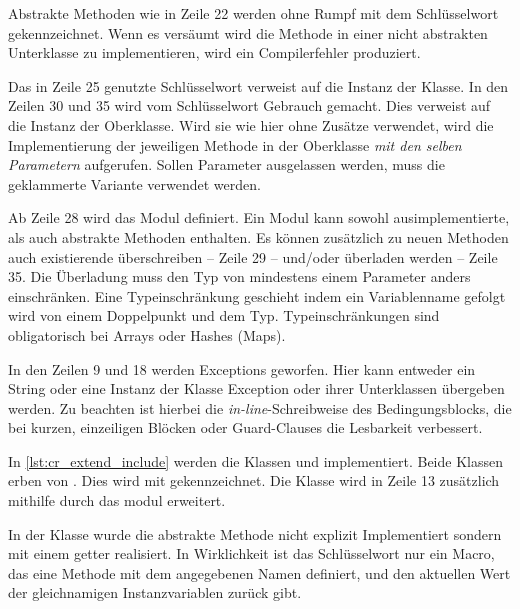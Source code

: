 

Abstrakte Methoden wie in Zeile 22 werden ohne Rumpf mit dem Schlüsselwort
 gekennzeichnet.  Wenn es versäumt wird die Methode in einer
nicht abstrakten Unterklasse zu implementieren, wird ein Compilerfehler
produziert.

Das in Zeile 25 genutzte Schlüsselwort  verweist auf die Instanz
der Klasse.  In den Zeilen 30 und 35 wird vom Schlüsselwort 
Gebrauch gemacht.  Dies verweist auf die Instanz der Oberklasse.  Wird sie wie
hier ohne Zusätze verwendet, wird die Implementierung der jeweiligen Methode in
der Oberklasse \emph{mit den selben Parametern} aufgerufen.  Sollen Parameter
ausgelassen werden, muss die geklammerte Variante
 verwendet werden.

Ab Zeile 28 wird das Modul  definiert.  Ein Modul kann sowohl
ausimplementierte, als auch abstrakte Methoden enthalten.  Es können zusätzlich
zu neuen Methoden auch existierende überschreiben -- Zeile 29 -- und/oder
überladen werden -- Zeile 35.  Die Überladung muss den Typ von mindestens einem
Parameter anders einschränken.  Eine Typeinschränkung geschieht indem ein
Variablenname gefolgt wird von einem Doppelpunkt und dem Typ.
Typeinschränkungen sind obligatorisch bei Arrays oder Hashes (Maps).

In den Zeilen 9 und 18 werden Exceptions geworfen.  Hier kann entweder ein
String oder eine Instanz der Klasse Exception oder ihrer Unterklassen übergeben
werden.  Zu beachten ist hierbei die \emph{in-line}-Schreibweise des
Bedingungsblocks, die bei kurzen, einzeiligen Blöcken oder Guard-Clauses die
Lesbarkeit verbessert.

In \cref{lst:cr_extend_include} werden die Klassen  und 
implementiert.  Beide Klassen erben von .  Dies wird mit
 gekennzeichnet.  Die Klasse  wird in Zeile 13
zusätzlich mithilfe durch das modul  erweitert.



In der Klasse  wurde die abstrakte Methode  nicht
explizit Implementiert sondern mit einem getter realisiert.  In Wirklichkeit ist
das Schlüsselwort  nur ein Macro, das eine Methode mit dem
angegebenen Namen definiert, und den aktuellen Wert der gleichnamigen
Instanzvariablen zurück gibt.


